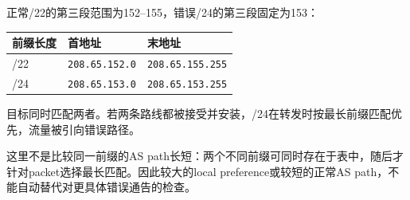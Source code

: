 \begin{workedsolution}
正常/22的第三段范围为152--155，错误/24的第三段固定为153：
\begin{center}
\small
\begin{tabular}{@{}lll@{}}
\toprule
前缀长度 & 首地址 & 末地址 \\
\midrule
/22 & \texttt{208.65.152.0} & \texttt{208.65.155.255} \\
/24 & \texttt{208.65.153.0} & \texttt{208.65.153.255} \\
\bottomrule
\end{tabular}
\end{center}
目标同时匹配两者。若两条路线都被接受并安装，/24在转发时按最长前缀匹配优先，流量被引向错误路径。

这里不是比较同一前缀的AS path长短：两个不同前缀可同时存在于表中，随后才针对packet选择最长匹配。因此较大的local preference或较短的正常AS path，不能自动替代对更具体错误通告的检查。
\end{workedsolution}
\endgroup
